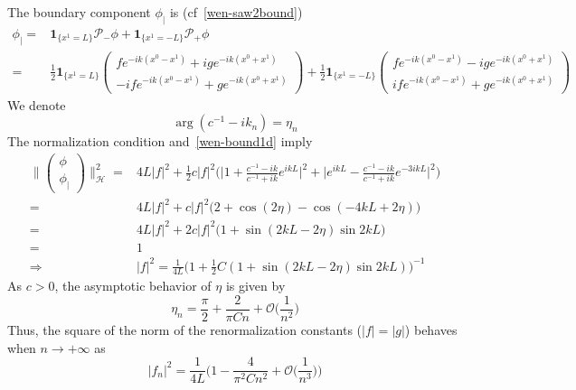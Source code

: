 %
The boundary component $\phi_|$ is (cf~\cref{wen-saw2bound})
\begin{equation*}
\begin{split}
\phi_| = & \mathbf{1}_{\{x^1 = L\}} \mathcal{P}_-\phi + \mathbf{1}_{\{x^1 = -L\}} \mathcal{P}_+\phi \\
%
= & \frac 1 2 \mathbf{1}_{\{x^1 = L\} } \begin{pmatrix} f e^{-ik(x^0 -x^1)} + ig e^{-ik(x^0 + x^1)} \\
-if e^{-ik(x^0 - x^1)} + g e^{-ik(x^0+x^1)}\end{pmatrix}
+ \frac 1 2 \mathbf{1}_{\{x^1 = - L\} } \begin{pmatrix} f e^{-ik(x^0 -x^1)} - ig e^{-ik(x^0 + x^1)} \\
if e^{-ik(x^0 - x^1)} + g e^{-ik(x^0+x^1)}\end{pmatrix} 
\end{split}
\end{equation*}
We denote
\begin{equation*}
\arg(c^{-1} - ik_n) = \eta_n
\end{equation*}
The normalization condition and~\cref{wen-bound1d} imply
\begin{equation*}
\begin{split}
\Big\| \begin{pmatrix} \phi \\  \phi_| \end{pmatrix} \Big\|^2_{\mathcal{H}}  = &
4L |f|^2 + \frac 1 2 c |f|^2 \bigg( \Big| 1 + \frac{c^{-1} - ik}{c^{-1} + ik}e^{ikL} \Big|^2
+ \Big| e^{ikL} - \frac{c^{-1} - ik}{c^{-1} + ik}e^{-3ikL} \Big|^2
\bigg) \\
%
=& 4L |f|^2 + c |f|^2 \big(2 + \cos(2\eta) - \cos(-4kL + 2\eta) \big) \\
%
=& 4L |f|^2 +2 c |f|^2 \big(1 + \sin(2kL - 2\eta) \sin 2kL  \big) \\
= & 1 \\
\Rightarrow &
|f|^2 = \frac{1}{4L} \Big( 1 + \frac 1 2 C (1 + \sin(2kL-2\eta) \sin 2kL ) \Big)^{-1}
\end{split}
\end{equation*}
As $c> 0 $, the asymptotic behavior of $\eta$ is given by
\begin{equation*}
\eta_n = \frac \pi 2 + \frac{2}{\pi Cn} + \mathcal{O}\big(\frac{1}{n^2}\big)
\end{equation*}
Thus, the square of the norm of the renormalization constants ($|f| = |g|$) behaves when $n\rightarrow +\infty$ as
\begin{equation*}
|f_n|^2 = 
\frac{1}{4L}\Big( 1 - \frac{4}{\pi^2C n^2} + \mathcal{O}\big(\frac{1}{n^3}\big) \Big)
\end{equation*}
